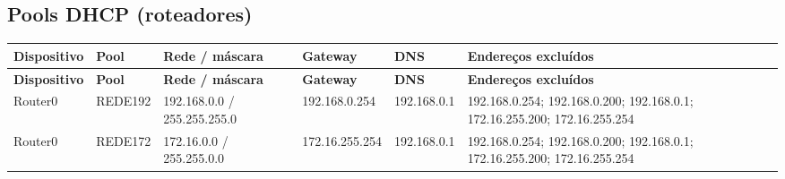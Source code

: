 \subsection{Pools DHCP (roteadores)}
\begingroup\scriptsize\setlength{\tabcolsep}{3pt}
\begin{longtable}{@{}p{}p{}p{}p{}p{}p{}@{}}
\toprule \textbf{Dispositivo} & \textbf{Pool} & \textbf{Rede / máscara} & \textbf{Gateway} & \textbf{DNS} & \textbf{Endereços excluídos} \\\midrule\endfirsthead
\toprule \textbf{Dispositivo} & \textbf{Pool} & \textbf{Rede / máscara} & \textbf{Gateway} & \textbf{DNS} & \textbf{Endereços excluídos} \\\midrule\endhead
Router0 & REDE192 & 192.168.0.0 / 255.255.255.0 & 192.168.0.254 & 192.168.0.1 & 192.168.0.254; 192.168.0.200; 192.168.0.1; 172.16.255.200; 172.16.255.254 \\
Router0 & REDE172 & 172.16.0.0 / 255.255.0.0 & 172.16.255.254 & 192.168.0.1 & 192.168.0.254; 192.168.0.200; 192.168.0.1; 172.16.255.200; 172.16.255.254 \\
\bottomrule
\end{longtable}\endgroup
